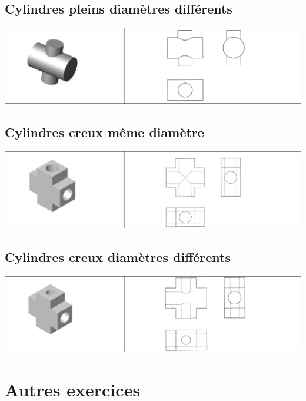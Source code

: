 \documentclass[11pt,oneside]{article}
\begin{document}
\subsection{Cylindres pleins diamètres différents}
\begin{center}
\includegraphics[width=.9\textwidth]{png/fig18}
\end{center}

\subsection{Cylindres creux même diamètre}
\begin{center}
\includegraphics[width=.9\textwidth]{png/fig19}
\end{center}

\subsection{Cylindres creux diamètres différents}
\begin{center}
\includegraphics[width=.9\textwidth]{png/fig20}
\end{center}

\section{Autres exercices}
\end{document}
